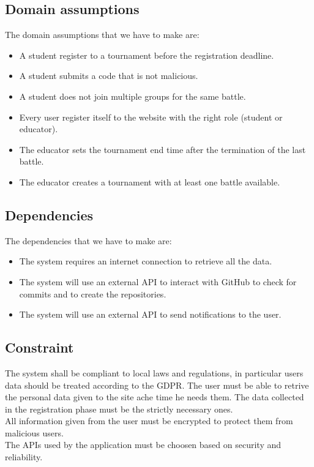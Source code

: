 \documentclass[12pt, a4paper]{report}
\begin{document}
    \subsection{Domain assumptions}
    The domain assumptions that we have to make are: 
    \begin{itemize}
        \item A student register to a tournament before the registration deadline. 
        \item A student submits a code that is not malicious. 
        \item A student does not join multiple groups for the same battle. 
        \item Every user register itself to the website with the right role (student or educator).
        \item The educator sets the tournament end time after the termination of the last battle. 
        \item The educator creates a tournament with at least one battle available.
    \end{itemize}

    \subsection{Dependencies}
    The dependencies that we have to make are: 
    \begin{itemize}
        \item The system requires an internet connection to retrieve all the data. 
        \item The system will use an external API to interact with GitHub to check for commits and to create the repositories.
        \item The system will use an external API to send notifications to the user. 
    \end{itemize}

    \subsection{Constraint}
    The system shall be compliant to local laws and regulations, in particular users data should be treated according to the GDPR. 
    The user must be able to retrive the personal data given to the site ache time he needs them. 
    The data collected in the registration phase must be the strictly necessary ones. \\
    All information given from the user must be encrypted to protect them from malicious users. \\
    The APIs used by the application must be choosen based on security and reliability.
\end{document}
